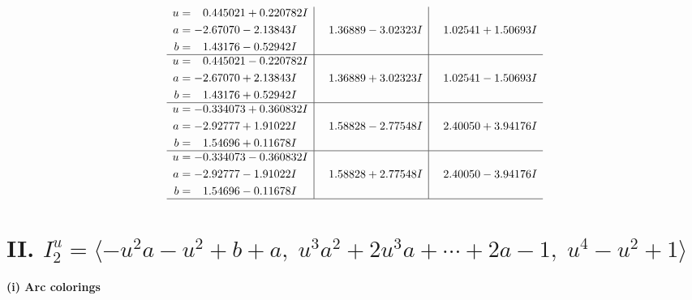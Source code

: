 \documentclass[1p]{elsarticle_modified}
\theoremstyle{definition}
\begin{document}
$$\begin{array}{c|c|c}
\begin{aligned}
u &= \phantom{-}0.445021 + 0.220782 I \\
a &= -2.67070 - 2.13843 I \\
b &= \phantom{-}1.43176 - 0.52942 I\end{aligned}
 & \phantom{-}1.36889 - 3.02323 I & \phantom{-}1.02541 + 1.50693 I \\ \hline\begin{aligned}
u &= \phantom{-}0.445021 - 0.220782 I \\
a &= -2.67070 + 2.13843 I \\
b &= \phantom{-}1.43176 + 0.52942 I\end{aligned}
 & \phantom{-}1.36889 + 3.02323 I & \phantom{-}1.02541 - 1.50693 I \\ \hline\begin{aligned}
u &= -0.334073 + 0.360832 I \\
a &= -2.92777 + 1.91022 I \\
b &= \phantom{-}1.54696 + 0.11678 I\end{aligned}
 & \phantom{-}1.58828 - 2.77548 I & \phantom{-}2.40050 + 3.94176 I \\ \hline\begin{aligned}
u &= -0.334073 - 0.360832 I \\
a &= -2.92777 - 1.91022 I \\
b &= \phantom{-}1.54696 - 0.11678 I\end{aligned}
 & \phantom{-}1.58828 + 2.77548 I & \phantom{-}2.40050 - 3.94176 I\\
 \hline 
 \end{array}$$\newpage\newpage\renewcommand{\arraystretch}{1}
\centering \section*{II. $I^u_{2}= \langle - u^2 a- u^2+b+a,\;u^3 a^2+2 u^3 a+\cdots+2 a-1,\;u^4- u^2+1 \rangle$}
\flushleft \textbf{(i) Arc colorings}\\
\end{document}
